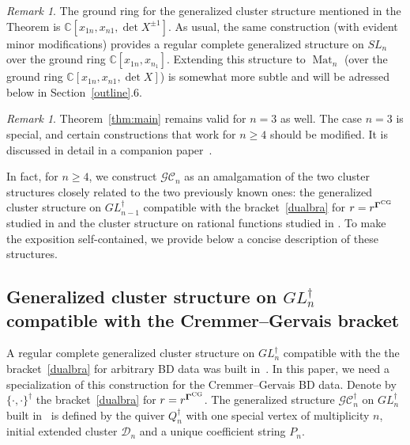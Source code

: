 \documentclass{amsart}
\theoremstyle{definition}
\theoremstyle{remark}
\newtheorem{remark}[theorem]{Remark}
\numberwithin{equation}{section}
\numberwithin{theorem}{section}
\def\C{{\mathbb C}}
\def\CC{{\mathcal C}}
\def\DD{{\mathcal D}}
\def\G{{\mathcal G}}
\def\bfG{\mathbf \Gamma}
\def\CG{{\rm CG}}
\def\Mat{\operatorname{Mat}}
\def\Poi{{\{{\cdot},{\cdot}\}}}
\begin{document}
\begin{remark}\label{threestruct}
The ground ring for the generalized cluster structure mentioned in the Theorem is $\C[x_{1n},x_{n1},\det X^{\pm1}]$. As usual, the same construction (with evident minor modifications) provides a regular complete
generalized structure on $SL_n$ over the ground ring $\C[x_{1n},x_{n_1}]$. Extending this structure to
$\Mat_n$ (over the ground ring $\C[x_{1n},x_{n1},\det X]$) is somewhat more subtle and will be adressed below in 
Section~\ref{outline}.6.
\end{remark}


 
\begin{remark} Theorem~\ref{thm:main} remains valid for $n=3$ as well. 
The case $n=3$ is special, and certain constructions that work for $n\ge4$ should be modified. It is discussed in detail in a companion paper~\cite{GSVpullback}.
\end{remark}



In fact, for $n\ge4$, we construct $\G\CC_n$ as an amalgamation of the two cluster structures closely related to the two previously known ones: the generalized cluster
structure on $GL_{n-1}^\dag$ compatible with the bracket~\eqref{dualbra} for $r=r^{\bfG^\CG}$ 
studied in \cite{GV} and 
the cluster structure on rational functions studied in \cite{GSV_Acta}. To make the exposition self-contained, we provide below a concise description of these structures.



\subsection{Generalized cluster structure on $GL_n^\dag$ compatible with the Cremmer--Gervais bracket}
\label{sec:dualcs}
A regular complete generalized cluster structure  on $GL_n^\dag$ compatible with the the bracket~\eqref{dualbra} for arbitrary BD data was built in~\cite{GV}. In this paper, we need a specialization of this construction for the Cremmer--Gervais BD data. Denote by $\Poi^\dag$ the bracket~\eqref{dualbra} for $r=r^{\bfG^\CG}$.  The generalized structure $\G\CC^\dag_n$ 
on $GL_n^\dag$ built in~\cite{GV} is defined by the quiver $Q_n^\dag$ with one special vertex of multiplicity $n$, initial extended cluster $\DD_n$ and a unique coefficient string $P_n$. 
\end{document}
